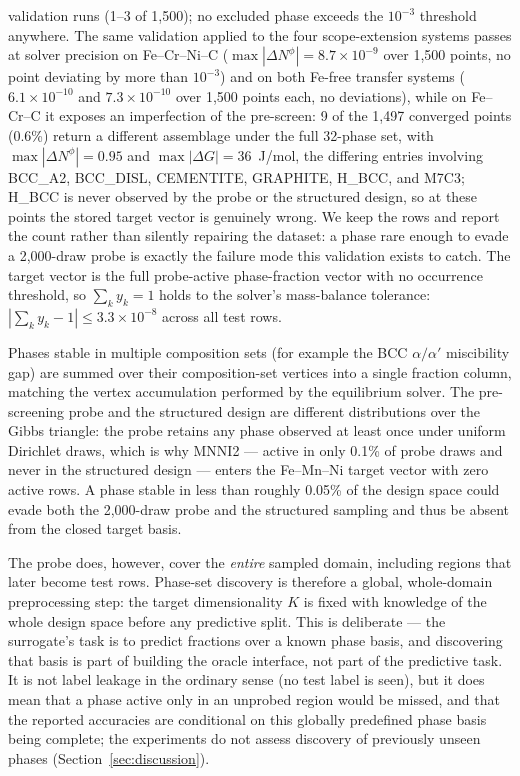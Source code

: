 \documentclass[preprint,12pt,authoryear]{elsarticle}
\newcommand{\Np}[1]{N^{#1}}
\begin{document}
validation runs (1--3 of 1{,}500); no excluded phase exceeds the
$10^{-3}$ threshold anywhere. The same validation applied to the four
scope-extension systems passes at solver precision on Fe--Cr--Ni--C
($\max |\Delta\Np{\phi}| = 8.7\times10^{-9}$ over 1{,}500 points, no
point deviating by more than $10^{-3}$) and on both Fe-free transfer
systems ($6.1\times10^{-10}$ and $7.3\times10^{-10}$ over 1{,}500 points
each, no deviations), while on Fe--Cr--C it exposes an
imperfection of the pre-screen: 9 of the 1{,}497 converged points (0.6\%)
return a different assemblage under the full 32-phase set, with $\max
|\Delta\Np{\phi}| = 0.95$ and $\max |\Delta G| = 36$~J/mol, the differing
entries involving BCC\_A2, BCC\_DISL, CEMENTITE, GRAPHITE, H\_BCC, and
M7C3; H\_BCC is never observed by the probe or the structured design, so
at these points the stored target vector is genuinely wrong. We keep the
rows and report the count rather than silently repairing the dataset: a
phase rare enough to evade a 2{,}000-draw probe is exactly the failure
mode this validation exists to catch. The target vector is the full probe-active
phase-fraction vector with no occurrence threshold, so $\sum_k y_k = 1$
holds to the solver's mass-balance tolerance: $|\sum_k y_k - 1| \le
3.3\times10^{-8}$ across all test rows.

Phases stable in multiple composition sets (for example the BCC
$\alpha/\alpha'$ miscibility gap) are summed over their composition-set
vertices into a single fraction column, matching the vertex accumulation
performed by the equilibrium solver. The pre-screening probe and the
structured design are different distributions over the Gibbs triangle: the
probe retains any phase observed at least once under uniform Dirichlet
draws, which is why MNNI2 --- active in only 0.1\% of probe draws and never
in the structured design --- enters the Fe--Mn--Ni target vector with zero
active rows. A phase stable in less than roughly 0.05\% of the design space
could evade both the 2{,}000-draw probe and the structured sampling and
thus be absent from the closed target basis.

The probe does, however, cover the \emph{entire} sampled domain, including
regions that later become test rows. Phase-set discovery is therefore a
global, whole-domain preprocessing step: the target dimensionality $K$ is
fixed with knowledge of the whole design space before any predictive split.
This is deliberate --- the surrogate's task is to predict fractions over a
known phase basis, and discovering that basis is part of building the
oracle interface, not part of the predictive task. It is not label
leakage in the ordinary sense (no test label is seen), but it does mean
that a phase active only in an unprobed region would be missed, and that
the reported accuracies are conditional on this globally predefined phase
basis being complete; the experiments do not assess discovery of previously
unseen phases (Section~\ref{sec:discussion}).
\end{document}
